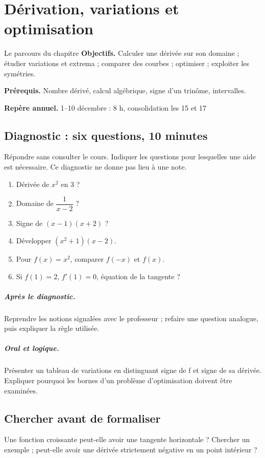 \chapter{Dérivation, variations et optimisation}\label{C06}
\begin{repere}{Le parcours du chapitre}
\textbf{Objectifs.} Calculer une dérivée sur son domaine ; étudier variations et extrema ; comparer des courbes ; optimiser ; exploiter les symétries.

\textbf{Prérequis.} Nombre dérivé, calcul algébrique, signe d’un trinôme, intervalles.

\textbf{Repère annuel.} 1–10 décembre : 8 h, consolidation les 15 et 17\end{repere}
\section*{Diagnostic : six questions, 10 minutes}\label{C06-D}
Répondre sans consulter le cours. Indiquer les questions pour lesquelles une aide est nécessaire. Ce diagnostic ne donne pas lieu à une note.
\begin{enumerate}
\item Dérivée de $x^2$ en 3 ?
\item Domaine de $\dfrac{1}{x-2}$ ?
\item Signe de $(x-1)(x+2)$ ?
\item Développer $(x^2+1)(x-2)$.
\item Pour $f(x)=x^2$, comparer $f(-x)$ et $f(x)$.
\item Si $f(1)=2$, $f\prime(1)=0$, équation de la tangente ?
\end{enumerate}
\paragraph{Après le diagnostic.} Reprendre les notions signalées avec le professeur ; refaire une question analogue, puis expliquer la règle utilisée.
\paragraph{Oral et logique.} Présenter un tableau de variations en distinguant signe de f et signe de sa dérivée. Expliquer pourquoi les bornes d’un problème d’optimisation doivent être examinées.
\clearpage
\section*{Chercher avant de formaliser}\label{C06-RECH}
Une fonction croissante peut-elle avoir une tangente horizontale ? Chercher un exemple ; peut-elle avoir une dérivée strictement négative en un point intérieur ?
